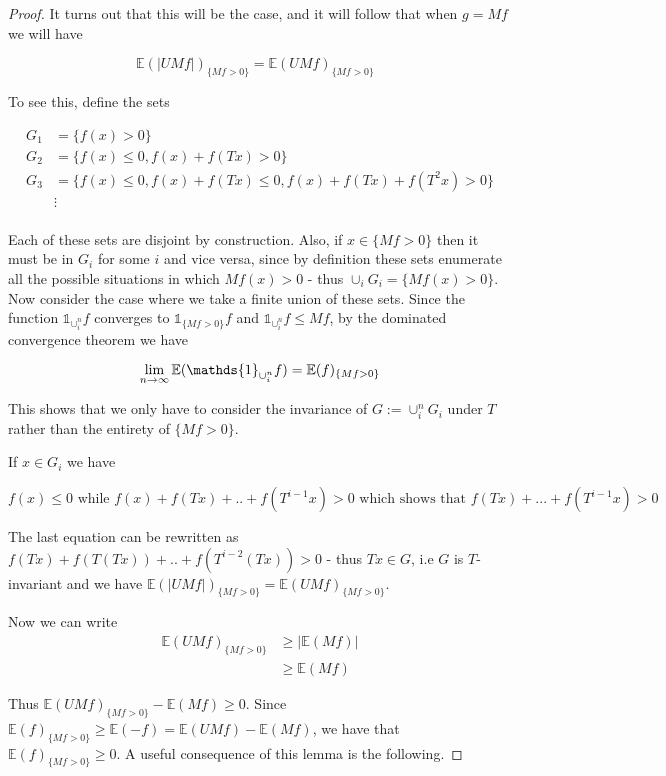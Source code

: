 \documentclass[letterpaper,10pt,oneside,onecolumn,reqno]{amsart}
\newcommand{\E}{\mathbb E}
\newcommand{\one}{\mathds{1}}      %
\theoremstyle{definition}
\begin{document}
\begin{proof}
It turns out that this will be the case, and it will follow that when $g=Mf$ we will have

$$\mbox{$\E(|UMf|)_{\{Mf>0\}} = \E(UMf)_{\{Mf>0\}}$ }$$

To see this, define the sets 

\begin{align*}
G_1 &= \{f(x) > 0\} \\
G_2 &= \{f(x) \leq 0, f(x) + f(Tx) > 0\} \\
G_3 &= \{f(x) \leq 0, f(x) + f(Tx) \leq 0, f(x) + f(Tx) + f(T^2x) > 0\} \\
&\vdots \\
\end{align*}

Each of these sets are disjoint by construction. Also, if $x\in{\{Mf>0\}}$ then it must be in $G_i$ for some $i$ and vice versa, since by definition these sets enumerate all the possible situations in which $Mf(x) > 0$ - thus $\cup_i G_i = {\{Mf(x) > 0\}}$. Now consider the case where we take a finite union of these sets. Since the function $\one_{\cup_i^n}f$ converges to $\one_{\{Mf > 0\}}f$ and $\one_{\cup_i^n}f \leq Mf$, by the dominated convergence theorem we have

\begin{equation}
\lim_{n \to \infty}\E(\one_{\cup_i^n}f) = \E(f)_{\{Mf>0\}} \\
\end{equation}

This shows that we only have to consider the invariance of $G:=\cup_i^nG_i$ under $T$ rather than the entirety of $\{Mf>0\}$. 

If $x \in G_i$ we have 

$$\mbox{$f(x) \leq 0$ while $f(x)+f(Tx)+..+f(T^{i-1}x) > 0$ which shows that $f(Tx)+...+f(T^{i-1}x) > 0$}$$

The last equation can be rewritten as $f(Tx)+f(T(Tx))+..+f(T^{i-2}(Tx)) > 0$ - thus $Tx \in G$, i.e $G$ is $T$-invariant and we have $\E(|UMf|)_{\{Mf>0\}} = \E(UMf)_{\{Mf>0\}}$.

Now we can write 
\begin{align*}
\E(UMf)_{\{Mf>0\}} &\geq |\E(Mf)| \\
&\geq \E(Mf)
\end{align*}

Thus $\E(UMf)_{\{Mf>0\}}-\E(Mf) \geq 0$. Since $\E(f)_{\{Mf>0\}} \geq \E(-f) = \E(UMf)-\E(Mf)$, we have that $\E(f)_{\{Mf>0\}} \geq 0$. A useful consequence of this lemma is the following.

\end{proof}
\end{document}
